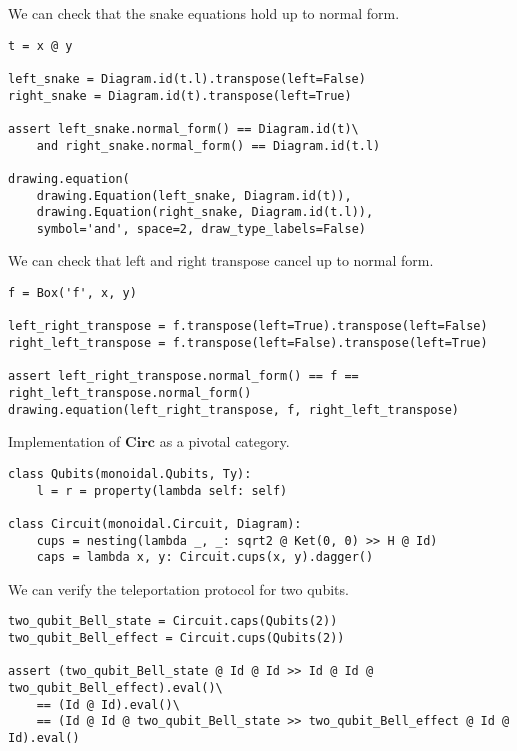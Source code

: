 \begin{example}
We can check that the snake equations hold up to normal form.

\begin{verbatim}
t = x @ y

left_snake = Diagram.id(t.l).transpose(left=False)
right_snake = Diagram.id(t).transpose(left=True)

assert left_snake.normal_form() == Diagram.id(t)\
    and right_snake.normal_form() == Diagram.id(t.l)

drawing.equation(
    drawing.Equation(left_snake, Diagram.id(t)),
    drawing.Equation(right_snake, Diagram.id(t.l)),
    symbol='and', space=2, draw_type_labels=False)
\end{verbatim}

\end{example}

\begin{example}
We can check that left and right transpose cancel up to normal form.

\begin{verbatim}
f = Box('f', x, y)

left_right_transpose = f.transpose(left=True).transpose(left=False)
right_left_transpose = f.transpose(left=False).transpose(left=True)

assert left_right_transpose.normal_form() == f == right_left_transpose.normal_form()
drawing.equation(left_right_transpose, f, right_left_transpose)
\end{verbatim}

\end{example}

\begin{python}
{\normalfont Implementation of $\mathbf{Circ}$ as a pivotal category.}

\begin{verbatim}
class Qubits(monoidal.Qubits, Ty):
    l = r = property(lambda self: self)

class Circuit(monoidal.Circuit, Diagram):
    cups = nesting(lambda _, _: sqrt2 @ Ket(0, 0) >> H @ Id)
    caps = lambda x, y: Circuit.cups(x, y).dagger()
\end{verbatim}
\end{python}

\begin{example}
We can verify the teleportation protocol for two qubits.

\begin{verbatim}
two_qubit_Bell_state = Circuit.caps(Qubits(2))
two_qubit_Bell_effect = Circuit.cups(Qubits(2))

assert (two_qubit_Bell_state @ Id @ Id >> Id @ Id @ two_qubit_Bell_effect).eval()\
    == (Id @ Id).eval()\
    == (Id @ Id @ two_qubit_Bell_state >> two_qubit_Bell_effect @ Id @ Id).eval()
\end{verbatim}
\end{example}

